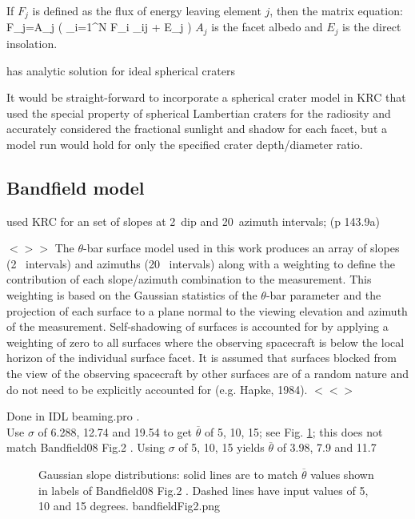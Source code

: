 \documentclass{article}
\newcommand{\bq}{$ < \! > \!   \! >$ } %
\newcommand{\eq}{ $< \! \! < \! > $ } %
\begin{document}
If $F_j$ is defined as the flux of energy leaving element $j$, then the matrix equation:
\qb F_j=A_j \left( \sum_{i=1}^N F_i \alpha_{ij} + E_j \right) \qe
$A_j$ is the facet albedo and $E_j$ is the direct insolation.

 has analytic solution for ideal spherical craters

It would be straight-forward to incorporate a spherical crater model in KRC that
used the special property of spherical Lambertian craters for the radiosity and
accurately considered the fractional sunlight and shadow for each facet, but a
model run would hold for only the specified crater depth/diameter ratio.

\subsection{Bandfield model}

 used KRC for an set of slopes at 2\qd ~dip and 20\qd ~azimuth intervals; (p 143.9a)

\bq The $\theta$-bar surface model used in this work produces an array of slopes
(2\qd~ intervals) and azimuths (20\qd~ intervals) along with a weighting to
define the contribution of each slope/azimuth combination to the
measurement. This weighting is based on the Gaussian statistics of the
$\theta$-bar parameter and the projection of each surface to a plane normal to
the viewing elevation and azimuth of the measurement. Self-shadowing of surfaces
is accounted for by applying a weighting of zero to all surfaces where the
observing spacecraft is below the local horizon of the individual surface
facet. It is assumed that surfaces blocked from the view of the observing
spacecraft by other surfaces are of a random nature and do not need to be
explicitly accounted for (e.g. Hapke, 1984). \eq

Done in IDL beaming.pro . \\ Use $\sigma$ of 6.288, 12.74 and 19.54 to get
$\overline{\theta}$ of 5, 10, 15; see Fig. \ref{bandfieldFig2}; this does not
match Bandfield08 Fig.2 .  Using $\sigma$ of 5, 10, 15 yields
$\overline{\theta}$ of 3.98, 7.9 and 11.7

\begin{figure}[!ht] 
\caption[Gaussian slopes ]{Gaussian slope distributions: solid lines are to
  match $\overline{\theta}$ values shown in labels of Bandfield08 Fig.2 . Dashed
  lines have input values of 5, 10 and 15 degrees.
\label{bandfieldFig2} bandfieldFig2.png  }
\end{figure} 
\end{document}
